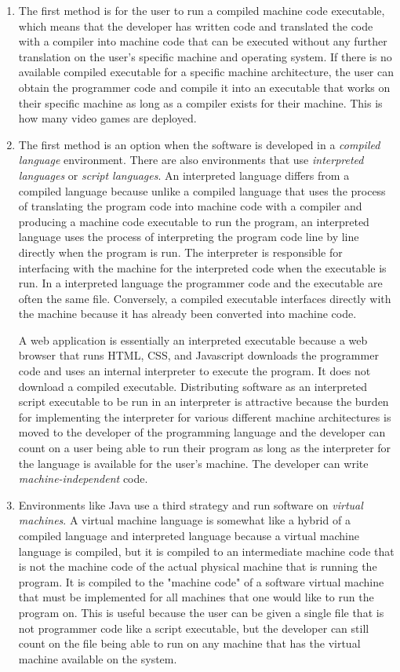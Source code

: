 \begin{enumerate}
\item The first method is for the user to run a compiled machine code executable, which means that the developer has written code and translated the code with a compiler into machine code that can be executed without any further translation on the user's specific machine and operating system. If there is no available compiled executable for a specific machine architecture, the user can obtain the programmer code and compile it into an executable that works on their specific machine as long as a compiler exists for their machine. This is how many video games are deployed.

\item The first method is an option when the software is developed in a \emph{compiled language} environment. There are also environments that use \emph{interpreted languages} or \emph{script languages}. An interpreted language differs from a compiled language because unlike a compiled language that uses the process of translating the program code into machine code with a compiler and producing a machine code executable to run the program, an interpreted language uses the process of interpreting the program code line by line directly when the program is run. The interpreter is responsible for interfacing with the machine for the interpreted code when the executable is run. In a interpreted language the programmer code and the executable are often the same file. Conversely, a compiled executable interfaces directly with the machine because it has already been converted into machine code. 

A web application is essentially an interpreted executable because a web browser that runs HTML, CSS, and Javascript downloads the programmer code and uses an internal interpreter to execute the program. It does not download a compiled executable. Distributing software as an interpreted script executable to be run in an interpreter is attractive because the burden for implementing the interpreter for various different machine architectures is moved to the developer of the programming language and the developer can count on a user being able to run their program as long as the interpreter for the language is available for the user's machine. The developer can write \emph{machine-independent} code.

\item Environments like Java use a third strategy and run software on \emph{virtual machines}. A virtual machine language is somewhat like a hybrid of a compiled language and interpreted language because a virtual machine language is compiled, but it is compiled to an intermediate machine code that is not the machine code of the actual physical machine that is running the program. It is compiled to the "machine code" of a software virtual machine that must be implemented for all machines that one would like to run the program on. This is useful because the user can be given a single file that is not programmer code like a script executable, but the developer can still count on the file being able to run on any machine that has the virtual machine available on the system.
\end{enumerate}

